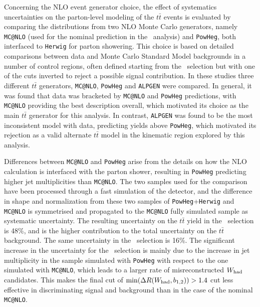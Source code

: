 Concerning the NLO event generator choice, the effect of 
systematics uncertainties on the parton-level modeling of the
$t\bar{t}$ events is evaluated by comparing the distributions from two 
NLO Monte Carlo generators, namely \texttt{MC@NLO} (used for the nominal 
prediction in the \wbx\ 
analysis) and \texttt{PowHeg}, both interfaced to \texttt{Herwig} for
parton showering.  This choice is based on detailed comparisons
between data and Monte Carlo Standard Model backgrounds in a number 
of control regions, often defined starting from the \loose\ selection 
but with one of the cuts inverted to reject a possible signal contribution. 
In these studies three different $t\bar{t}$ generators, \texttt{MC@NLO}, \texttt{PowHeg} and
\texttt{ALPGEN} were compared. In general, it was found that 
data was bracketed by \texttt{MC@NLO} and \texttt{PowHeg} predictions,
with \texttt{MC@NLO} providing the best description overall, which 
motivated its choice as the main $t\bar{t}$ generator for this analysis. 
In contrast, \texttt{ALPGEN} was found to be the most inconsistent 
model with data, predicting yields above \texttt{PowHeg}, which 
motivated its rejection
as a valid alternate $t\bar{t}$  model in the kinematic region 
explored by this analysis.

Differences between \texttt{MC@NLO} and \texttt{PowHeg} arise from 
the details on how the NLO calculation is interfaced with the parton 
shower, resulting in \texttt{PowHeg} predicting higher
jet multiplicities than \texttt{MC@NLO}. The two samples used for the
comparison have been processed through a fast simulation of the detector,
and the difference in shape and normalization from these two samples of
\texttt{PowHeg}+\texttt{Herwig} 
and \texttt{MC@NLO} is symmetrised and propagated to the 
\texttt{MC@NLO} fully simulated sample as systematic uncertainty. 
The resulting uncertainty on the $t\bar{t}$ yield in the \tight\ selection 
is 48\%, and is the higher contribution to the total uncertainty
on the $t\bar{t}$ background. The same uncertainty in the \loose\ selection 
is 16\%. The significant
increase in the uncertainty for the \tight\ selection 
is mainly due to the increase in jet multiplicity in the
sample simulated with \texttt{PowHeg} with respect to the
one simulated with \texttt{MC@NLO}, 
which leads to a larger rate of misreconstructed $W_{\rm had}$ 
candidates. This makes the final cut of 
$\min(\Delta R(W_{\rm had}, b_{1,2}))>1.4$ cut less 
effective in discriminating signal and background than in the 
case of the nominal \texttt{MC@NLO}.

